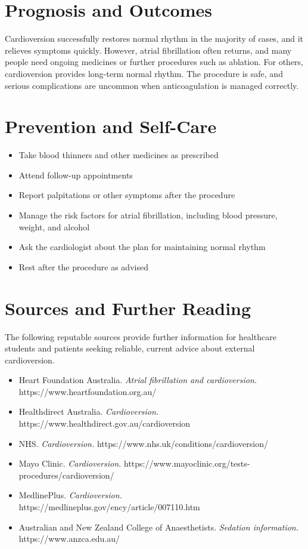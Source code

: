 \section*{Prognosis and Outcomes}
Cardioversion successfully restores normal rhythm in the majority of cases, and it relieves symptoms quickly. However, atrial fibrillation often returns, and many people need ongoing medicines or further procedures such as ablation. For others, cardioversion provides long-term normal rhythm. The procedure is safe, and serious complications are uncommon when anticoagulation is managed correctly.

\section*{Prevention and Self-Care}
\begin{itemize}
    \item Take blood thinners and other medicines as prescribed
    \item Attend follow-up appointments
    \item Report palpitations or other symptoms after the procedure
    \item Manage the risk factors for atrial fibrillation, including blood pressure, weight, and alcohol
    \item Ask the cardiologist about the plan for maintaining normal rhythm
    \item Rest after the procedure as advised
\end{itemize}

\section*{Sources and Further Reading}
The following reputable sources provide further information for healthcare students and patients seeking reliable, current advice about external cardioversion.
\begin{itemize}
    \item Heart Foundation Australia. \textit{Atrial fibrillation and cardioversion.} https://www.heartfoundation.org.au/
    \item Healthdirect Australia. \textit{Cardioversion.} https://www.healthdirect.gov.au/cardioversion
    \item NHS. \textit{Cardioversion.} https://www.nhs.uk/conditions/cardioversion/
    \item Mayo Clinic. \textit{Cardioversion.} https://www.mayoclinic.org/tests-procedures/cardioversion/
    \item MedlinePlus. \textit{Cardioversion.} https://medlineplus.gov/ency/article/007110.htm
    \item Australian and New Zealand College of Anaesthetists. \textit{Sedation information.} https://www.anzca.edu.au/
\end{itemize}
